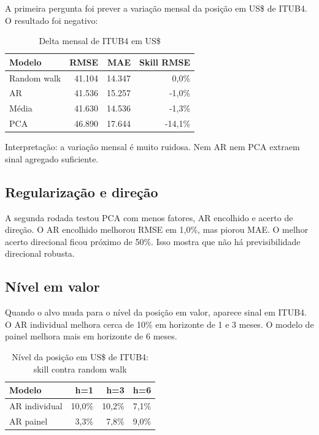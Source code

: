 \documentclass[11pt,a4paper]{article}
\begin{document}
A primeira pergunta foi prever a variação mensal da posição em US\$ de ITUB4. O resultado foi negativo:

\begin{table}[H]\centering
\caption{Delta mensal de ITUB4 em US\$}
\small
\begin{tabular}{lrrr}
\toprule
Modelo & RMSE & MAE & Skill RMSE \\
\midrule
Random walk & 41.104 & 14.347 & 0,0\% \\
AR & 41.536 & 15.257 & -1,0\% \\
Média & 41.630 & 14.536 & -1,3\% \\
PCA & 46.890 & 17.644 & -14,1\% \\
\bottomrule
\end{tabular}
\end{table}

Interpretação: a variação mensal é muito ruidosa. Nem AR nem PCA extraem sinal agregado suficiente.

\subsection{Regularização e direção}

A segunda rodada testou PCA com menos fatores, AR encolhido e acerto de direção. O AR encolhido melhorou
RMSE em 1,0\%, mas piorou MAE. O melhor acerto direcional ficou próximo de 50\%. Isso mostra que não há
previsibilidade direcional robusta.

\subsection{Nível em valor}

Quando o alvo muda para o nível da posição em valor, aparece sinal em ITUB4. O AR individual melhora cerca
de 10\% em horizonte de 1 e 3 meses. O modelo de painel melhora mais em horizonte de 6 meses.

\begin{table}[H]\centering
\caption{Nível da posição em US\$ de ITUB4: skill contra random walk}
\small
\begin{tabular}{lrrr}
\toprule
Modelo & h=1 & h=3 & h=6 \\
\midrule
AR individual & 10,0\% & 10,2\% & 7,1\% \\
AR painel & 3,3\% & 7,8\% & 9,0\% \\
\bottomrule
\end{tabular}
\end{table}
\end{document}

